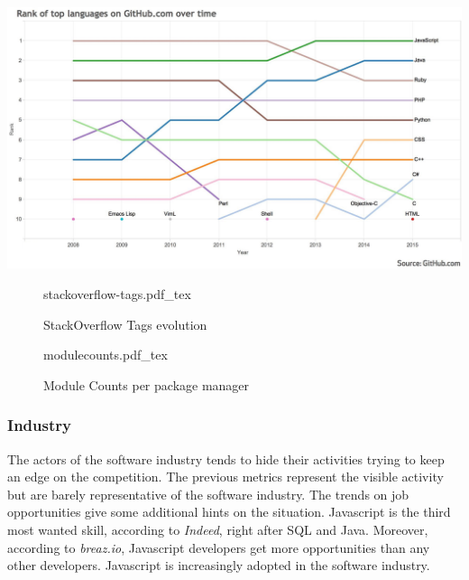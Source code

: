 
\includegraphics[width=0.9\linewidth]{../../data/js-trends/github-ranks}


\begin{figure}
    \centering
    \small
    \def\svgwidth{0.9\columnwidth}
    {stackoverflow-tags.pdf_tex}
    \label{fig:so-tags}
    \caption{StackOverflow Tags evolution}
\end{figure}


\begin{figure}
    \centering
    \small
    \def\svgwidth{0.9\columnwidth}
    {modulecounts.pdf_tex}
    \label{fig:modulecounts}
    \caption{Module Counts per package manager}    
\end{figure}

\subsubsection{Industry}

The actors of the software industry tends to hide their activities trying to keep an edge on the competition.
The previous metrics represent the visible activity but are barely representative of the software industry.
The trends on job opportunities give some additional hints on the situation.
Javascript is the third most wanted skill, according to \textit{Indeed}, right after SQL and Java.
Moreover, according to \textit{breaz.io}, Javascript developers get more opportunities than any other developers.
Javascript is increasingly adopted in the software industry.

